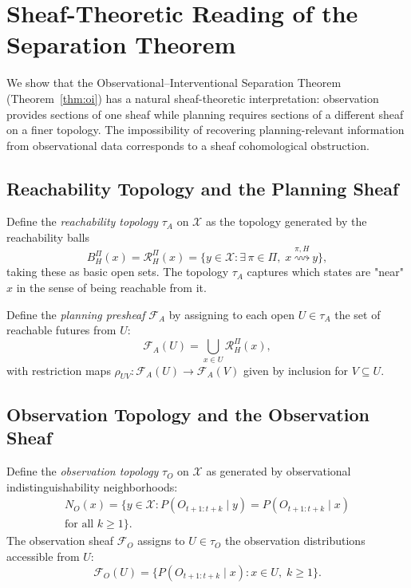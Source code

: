\documentclass[10pt,twocolumn]{article}
\theoremstyle{plain}
\theoremstyle{definition}
\theoremstyle{remark}
\newcommand{\RHP}{\mathcal{R}_{H}^{\Pi}}
\newcommand{\calX}{\mathcal{X}}
\begin{document}
\section{Sheaf-Theoretic Reading of the Separation Theorem}
\label{app:sheaf}

We show that the Observational--Interventional Separation Theorem
(Theorem~\ref{thm:oi}) has a natural sheaf-theoretic interpretation: observation
provides sections of one sheaf while planning requires sections of a different
sheaf on a finer topology. The impossibility of recovering planning-relevant
information from observational data corresponds to a sheaf cohomological
obstruction.

\subsection*{Reachability Topology and the Planning Sheaf}

Define the \emph{reachability topology} $\tau_A$ on $\calX$ as the topology
generated by the reachability balls
\[
  B_H^\Pi(x) = \RHP(x) = \{y\in\calX : \exists\,\pi\in\Pi,\;
  x\overset{\pi,H}{\rightsquigarrow}y\},
\]
taking these as basic open sets. The topology $\tau_A$ captures which states
are "near" $x$ in the sense of being reachable from it.

Define the \emph{planning presheaf} $\mathcal{F}_A$ by assigning to each open
$U\in\tau_A$ the set of reachable futures from $U$:
\[
  \mathcal{F}_A(U) = \bigcup_{x\in U}\RHP(x),
\]
with restriction maps $\rho_{UV}:\mathcal{F}_A(U)\to\mathcal{F}_A(V)$ given by
inclusion for $V\subseteq U$.

\subsection*{Observation Topology and the Observation Sheaf}

Define the \emph{observation topology} $\tau_O$ on $\calX$ as generated by
observational indistinguishability neighborhoods:
\begin{multline*}
  N_O(x) = \bigl\{y\in\calX :
  P(O_{t+1:t+k}\mid y) = P(O_{t+1:t+k}\mid x)\\
  \text{for all } k\geq 1\bigr\}.
\end{multline*}
The observation sheaf $\mathcal{F}_O$ assigns to $U\in\tau_O$ the observation
distributions accessible from $U$:
\[
  \mathcal{F}_O(U) = \bigl\{P(O_{t+1:t+k}\mid x) :
  x\in U,\; k\geq 1\bigr\}.
\]
\end{document}
